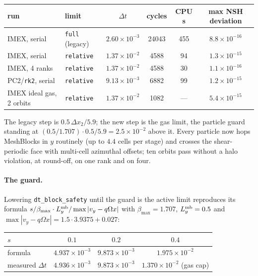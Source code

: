 \documentclass[11pt]{article}
\newcommand{\code}[1]{\texttt{#1}}
\newcommand{\Om}{\Omega}
\begin{document}
\begin{center}
\small
\begin{tabular}{@{}llcccc@{}}
\toprule
run & limit & $\Delta t$ & cycles & CPU s & max NSH deviation \\
\midrule
IMEX, serial & \code{full} (legacy) & $2.60\times10^{-3}$ & 24043 & 455 & $8.8\times10^{-16}$ \\
IMEX, serial & \code{relative} & $1.37\times10^{-2}$ & 4588 & 94 & $1.3\times10^{-15}$ \\
IMEX, 4 ranks & \code{relative} & $1.37\times10^{-2}$ & 4588 & 30 & $1.1\times10^{-16}$ \\
PC2/\code{rk2}, serial & \code{relative} & $9.13\times10^{-3}$ & 6882 & 99 & $1.2\times10^{-15}$ \\
IMEX ideal gas, 2 orbits & \code{relative} & $1.37\times10^{-2}$ & 1082 & --- & $5.4\times10^{-15}$ \\
\bottomrule
\end{tabular}
\end{center}

The legacy step is $0.5\,\Delta x_2/5.9$; the new step is the gas limit, the particle
guard standing at $(0.5/1.707)\cdot 0.5/5.9 = 2.5\times10^{-2}$ above it. Every particle
now hops MeshBlocks in $y$ routinely (up to $4.4$ cells per stage) and crosses the
shear-periodic face with multi-cell azimuthal offsets; ten orbits pass without a halo
violation, at round-off, on one rank and on four.

\paragraph{The guard.} Lowering \code{dt\_block\_safety} until the guard is the active
limit reproduces its formula
$s/\beta_{\max}\cdot L^{\rm mb}_y/\max|v_y - q\Om x|$ with $\beta_{\max} = 1.707$,
$L^{\rm mb}_y = 0.5$ and $\max|v_y - q\Om x| = 1.5\cdot 3.9375 + 0.027$:

\begin{center}
\small
\begin{tabular}{@{}lccc@{}}
\toprule
$s$ & $0.1$ & $0.2$ & $0.4$ \\
\midrule
formula & $4.937\times10^{-3}$ & $9.873\times10^{-3}$ & $1.975\times10^{-2}$ \\
measured $\Delta t$ & $4.936\times10^{-3}$ & $9.873\times10^{-3}$ & $1.370\times10^{-2}$ (gas cap) \\
\bottomrule
\end{tabular}
\end{center}
\end{document}
